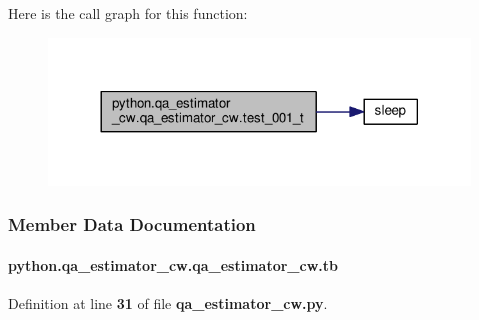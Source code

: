 Here is the call graph for this function\+:
\nopagebreak
\begin{figure}[H]
\begin{center}
\leavevmode
\includegraphics[width=317pt]{dd/d7f/classpython_1_1qa__estimator__cw_1_1qa__estimator__cw_ad707714ed8c7c200d56e0e6313c175b3_cgraph}
\end{center}
\end{figure}




\subsubsection{Member Data Documentation}
\paragraph[{tb}]{\setlength{\rightskip}{0pt plus 5cm}python.\+qa\+\_\+estimator\+\_\+cw.\+qa\+\_\+estimator\+\_\+cw.\+tb}\label{classpython_1_1qa__estimator__cw_1_1qa__estimator__cw_ad83e25d93e007ee910c3a96047fa85ff}


Definition at line {\bf 31} of file {\bf qa\+\_\+estimator\+\_\+cw.\+py}.



